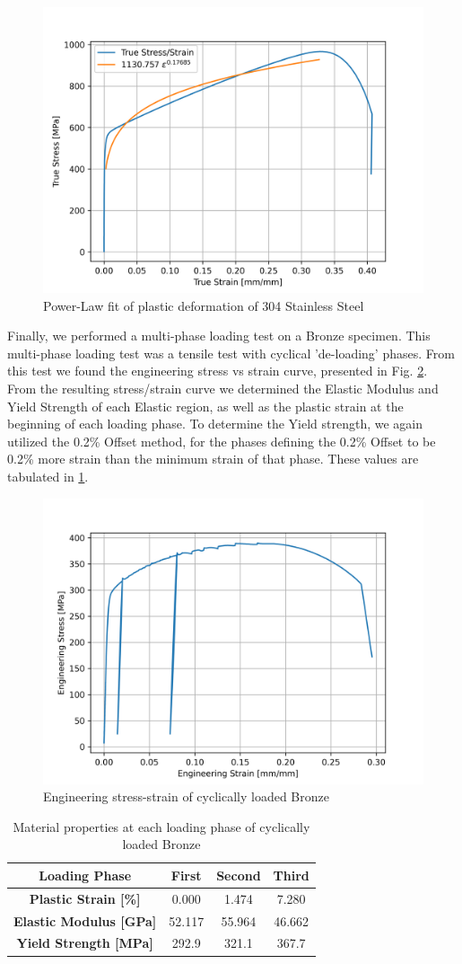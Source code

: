 \documentclass{article}
\begin{document}
\begin{figure}[!h]
    \centering
    \includegraphics[width=0.5\linewidth]{plots/q5_fit.png}
    \caption{Power-Law fit of plastic deformation of 304 Stainless Steel}
    \label{fig:q5fit}
\end{figure}
\newpage

Finally, we performed a multi-phase loading test on a Bronze specimen. This multi-phase loading test was a tensile test with cyclical 'de-loading' phases. From this test we found the engineering stress vs strain curve, presented in Fig. \ref{fig:br}. From the resulting stress/strain curve we determined the Elastic Modulus and Yield Strength of each Elastic region, as well as the plastic strain at the beginning of each loading phase. To determine the Yield strength, we again utilized the 0.2\% Offset method, for the phases defining the 0.2\% Offset to be 0.2\% more strain than the minimum strain of that phase. These values are tabulated in \ref{tab:q6}.

\begin{figure}[!h]
    \centering
    \includegraphics[width=0.5\linewidth]{plots/q6_br.png}
    \caption{Engineering stress-strain of cyclically loaded Bronze}
    \label{fig:br}
\end{figure}

\begin{table}[!h!]
    \centering
    \def\arraystretch{1.5}
    \caption{Material properties at each loading phase of cyclically loaded Bronze}
    \vspace{1pt}
    \begin{tabular}{|c|c|c|c|}
        \toprule
        \hline
        \textbf{Loading Phase} & First & Second & Third \\ 
        \midrule
        \hline
        \textbf{Plastic Strain [\%]} & 0.000 & 1.474 & 7.280 \\
        \textbf{Elastic Modulus [GPa]} & 52.117 & 55.964 & 46.662\\
        \textbf{Yield Strength [MPa]} & 292.9 & 321.1 & 367.7\\

        \hline
    \end{tabular}
    \label{tab:q6}
\end{table}
\newpage
\end{document}
